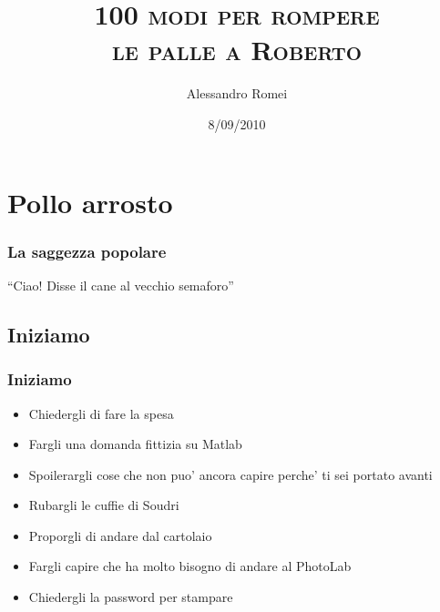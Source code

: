 \documentclass{beamer}
\title{\textsc{100 modi per rompere \\le palle a Roberto} }
\date{8/09/2010}
\author{Alessandro Romei}
\begin{document}
\begin{frame}
  \titlepage
\end{frame}


\begin{frame}
  \tableofcontents
\end{frame}

\section{Pollo arrosto}
\begin{frame}
\frametitle{La saggezza popolare}
``Ciao! Disse il cane al vecchio semaforo''
\end{frame}


\begin{frame}
\section{Iniziamo}
\frametitle{Iniziamo}

\begin{itemize}
  \item Chiedergli di fare la spesa
  \item Fargli una domanda fittizia su Matlab
  \item Spoilerargli cose che non puo' ancora capire perche' ti sei portato avanti
  \item Rubargli le cuffie di Soudri
  \item Proporgli di andare dal cartolaio
  \item Fargli capire che ha molto bisogno di andare al PhotoLab
  \item Chiedergli la password per stampare
  \item Dirgli che e' Juventino
\end{itemize}

\vfill

{\it \color{slidesRed} ...and the best is yet to come!}

\end{frame}



\begin{frame}
\subsection{Still again yet not more or plus}
 Symmetry and Spectroscopy is the way.
\end{frame}



\begin{frame}
\subsection{Sottosezione dueee}
 Symmetry and Spectroscopy is the way. The very very way
\end{frame}
\end{document}
